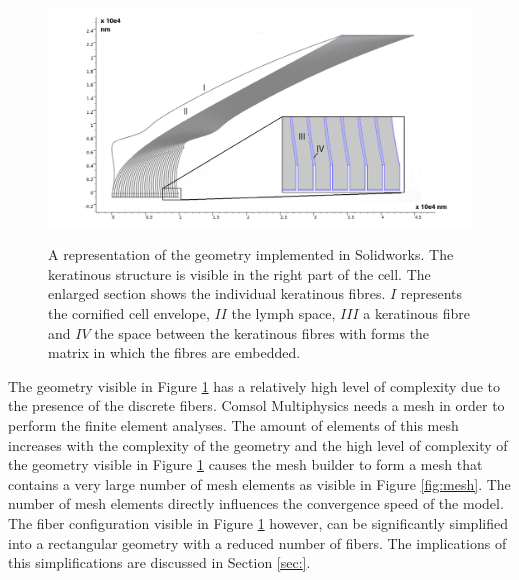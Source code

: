 \begin{figure}[h!] 
     \includegraphics[width=0.85\linewidth, height=6.5cm, angle=0]{images/discrete_model_implementation/solidworks geometry_schematic.png}
     \caption{A representation of the geometry implemented in Solidworks. The keratinous structure is visible in the right part of the cell. The enlarged section shows the individual keratinous fibres. $I$ represents the cornified cell envelope, $II$ the lymph space, $III$ a keratinous fibre and $IV$ the space between the keratinous fibres with forms the matrix in which the fibres are embedded.}
     \label{fig:geometry_solidworks}
\end{figure}

\qquad The geometry visible in Figure \ref{fig:geometry_solidworks} has a relatively high level of complexity due to the presence of the discrete fibers. Comsol Multiphysics needs a mesh in order to perform the finite element analyses. The amount of elements of this mesh increases with the complexity of the geometry and the high level of complexity of the geometry visible in Figure \ref{fig:geometry_solidworks} causes the mesh builder to form a mesh that contains a very large number of mesh elements as visible in Figure \ref{fig:mesh}. The number of mesh elements directly influences the convergence speed of the model. The fiber configuration visible in Figure \ref{fig:geometry_solidworks} however, can be significantly simplified into a rectangular geometry with a reduced number of fibers. The implications of this simplifications are discussed in Section \ref{sec:}.\\

